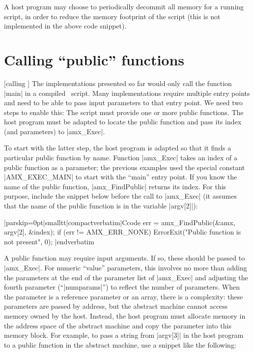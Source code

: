 A host program may choose to periodically decommit all memory for a
running script, in order to reduce the memory footprint of the script (this is
not implemented in the above code snippet).


\section{Calling ``public'' functions}
 [calling \midtilde]
The implementations presented so far would only call the function |main| in a
compiled \Small\ script. Many implementations require multiple entry points and
need to be able to pass input parameters to that entry point. We need two steps
to enable this:
\beginlist{1em}\compactlist
\list{\lbullet}
  The script must provide one or more public functions.
\list{\lbullet}
  The host program must be adapted to locate the public function and pass its
  index (and parameters) to |amx_Exec|.
\endlist

To start with the latter step, the host program is adapted so that it finds a
particular public function by name. Function |amx_Exec| takes an index of a
public function as a parameter; the previous examples used the special
constant |AMX_EXEC_MAIN| to start with the ``main'' entry point. If you know
the name of the public function, |amx_FindPublic| returns its index. For this
purpose, include the snippet below before the call to |amx_Exec| (it assumes
that the name of the public function is in the variable |argv[2]|):

\listingx\verbatim|parskip=0pt|smalltt|compactverbatim|Ccode
  err = amx_FindPublic(&amx, argv[2], &index);
  if (err != AMX_ERR_NONE)
    ErrorExit("Public function is not present", 0);
|endverbatim\endlistingx

 
A public function may require input arguments. If so, these should be passed to
|amx_Exec|. For numeric ``value'' parameters, this involves no more than adding
the parameters at the end of the parameter list of |amx_Exec| and adjusting the
fourth parameter (``|numparams|'') to reflect the number of parameters. When the
parameter is a reference parameter or an array, there is a complexity: these
parameters are passed by address, but the abstract machine cannot access memory
owned by the host. Instead, the host program must allocate memory in the address
space of the abstract machine and copy the parameter into this memory block.
For example, to pass a string from |argv[3]| in the host program to a public
function in the abstract machine, use a snippet like the following:

